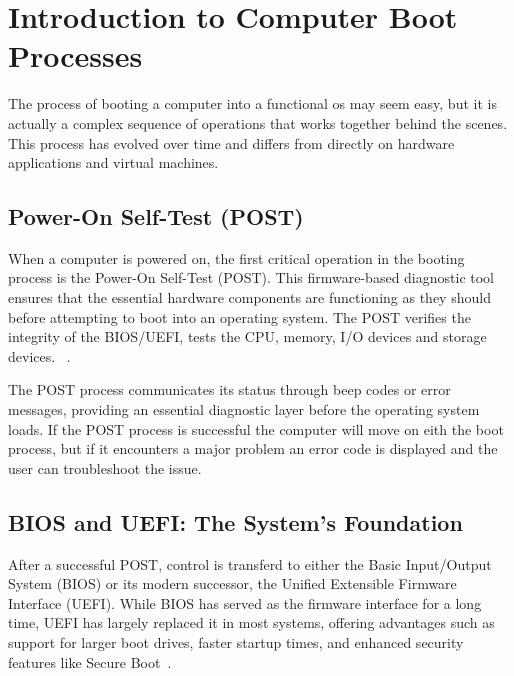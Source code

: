 \documentclass[a4paper,11pt]{article}
\begin{document}





\setlength{\parskip}{.5em} %
\cleardoublepage
\tableofcontents
\setlength{\parskip}{1em} %
\newpage





\section{Introduction to Computer Boot Processes}

The process of booting a computer into a functional os may seem easy, but it is actually a complex sequence of operations that works together behind the scenes. This process has evolved over time and differs from directly on hardware applications and virtual machines.   

\subsection{Power-On Self-Test (POST)}
When a computer is powered on, the first critical operation in the booting process is the Power-On Self-Test (POST). This firmware-based diagnostic tool ensures that the essential hardware components are functioning as they should before attempting to boot into an operating system. The POST verifies the integrity of the BIOS/UEFI, tests the CPU, memory, I/O devices and storage devices. ~\cite{post}.

The POST process communicates its status through beep codes or error messages, providing an essential diagnostic layer before the operating system loads. If the POST process is successful the computer will move on eith the boot process, but if it encounters a major problem an error code is displayed and the user can troubleshoot the issue.    

\subsection{BIOS and UEFI: The System's Foundation}
After a successful POST, control is transferd to either the Basic Input/Output System (BIOS) or its modern successor, the Unified Extensible Firmware Interface (UEFI). While BIOS has served as the firmware interface for a long time, UEFI has largely replaced it in most systems, offering advantages such as support for larger boot drives, faster startup times, and enhanced security features like Secure Boot~\cite{uefi_wiki}.
\end{document}

